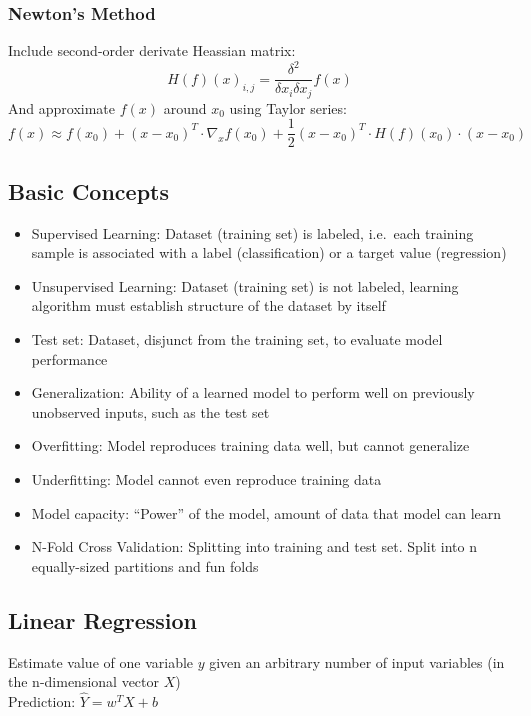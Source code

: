 \subsubsection{Newton's Method}%
\label{ml:ssub:netwons_method}
Include second-order derivate Heassian matrix:
\[H(f)(x)_{i,j} = \frac{\delta^2}{\delta x_i \delta x_j} f(x)\]
And approximate \(f(x)\) around \(x_0\) using Taylor series:
\[f(x) \approx f(x_0) + {(x - x_0)}^T \cdot \nabla_x f(x_0) + \frac{1}{2} {(x - x_0)}^T \cdot H (f)(x_0) \cdot (x - x_0)\]

\subsection{Basic Concepts}%
\label{ml:sub:basic_concepts}
\begin{itemize}
\item Supervised Learning: Dataset (training set) is labeled, i.e.\ each training sample is associated with a
  label (classification) or a target value (regression)
\item Unsupervised Learning: Dataset (training set) is not labeled, learning algorithm must establish structure
  of the dataset by itself
\item Test set: Dataset, disjunct from the training set, to evaluate model performance
\item Generalization: Ability of a learned model to perform well on previously unobserved inputs, such as the test set
\item Overfitting: Model reproduces training data well, but cannot generalize
\item Underfitting: Model cannot even reproduce training data
\item Model capacity: \enquote{Power} of the model, amount of data that model can learn
\item N-Fold Cross Validation: Splitting into training and test set. Split into n equally-sized partitions and fun folds
\end{itemize}

\subsection{Linear Regression}%
\label{ml:sub:linear_regression}
Estimate value of one variable \(y\) given an arbitrary number of input variables (in the n-dimensional vector \(X\))\\

Prediction: \(\hat{Y} = w^T X + b\)\\

